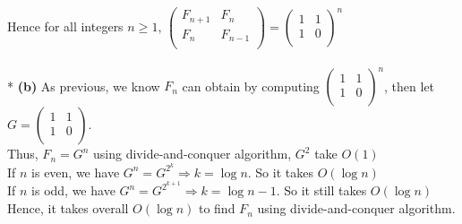 \documentclass[a4paper]{scrartcl}
\begin{document}
Hence for all integers $n \geq 1$,
$\begin{pmatrix}
  F_{n+1} & F_n \\
  F_n & F_{n-1} \\
 \end{pmatrix}
 =
 \begin{pmatrix}
   1 & 1 \\
   1 & 0 \\
 \end{pmatrix}^{\!n}$\\
 \\*
 {\bfseries(b)}
 As previous, we know $F_n$ can obtain by computing $\begin{pmatrix}
  1 & 1 \\
  1 & 0 \\
\end{pmatrix}^{\!n}$, then let $G=\begin{pmatrix}
  1 & 1 \\
  1 & 0 \\
\end{pmatrix}$.\\
Thus, $F_n=G^n$ using divide-and-conquer algorithm, $G^2$ take $O(1)$\\
If $n$ is even, we have $G^n=G^{2^k} \Rightarrow k = \log{n}$. So it takes $O(\log{n})$\\
If $n$ is odd, we have $G^n=G^{2^{k+1}} \Rightarrow k = \log{n} - 1$. So it still takes $O(\log{n})$
Hence, it takes overall $O(\log{n})$ to find $F_n$ using divide-and-conquer algorithm.
\end{document}
